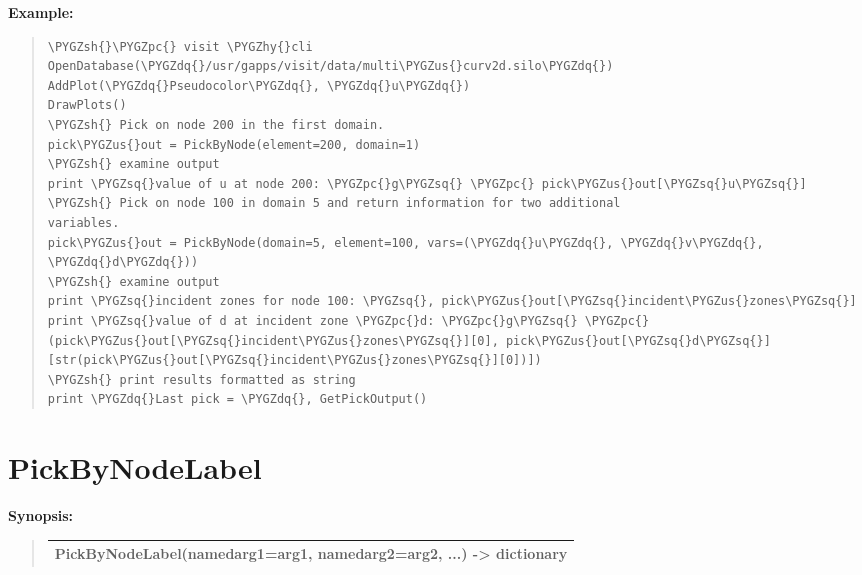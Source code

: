 \documentclass[letterpaper,10pt,english]{sphinxmanual}
\def\PYGZus{\char`\_}
\def\PYGZsh{\char`\#}
\def\PYGZpc{\char`\%}
\def\PYGZhy{\char`\-}
\def\PYGZsq{\char`\'}
\def\PYGZdq{\char`\"}
\renewcommand\PYGZsq{\textquotesingle}
\begin{document}
\begin{DUlineblock}{0em}
\item[] \textbf{Example:}
\item[] 
\end{DUlineblock}
\begin{quote}

\begin{Verbatim}[commandchars=\\\{\}]
\PYGZsh{}\PYGZpc{} visit \PYGZhy{}cli
OpenDatabase(\PYGZdq{}/usr/gapps/visit/data/multi\PYGZus{}curv2d.silo\PYGZdq{})
AddPlot(\PYGZdq{}Pseudocolor\PYGZdq{}, \PYGZdq{}u\PYGZdq{})
DrawPlots()
\PYGZsh{} Pick on node 200 in the first domain.
pick\PYGZus{}out = PickByNode(element=200, domain=1)
\PYGZsh{} examine output
print \PYGZsq{}value of u at node 200: \PYGZpc{}g\PYGZsq{} \PYGZpc{} pick\PYGZus{}out[\PYGZsq{}u\PYGZsq{}]
\PYGZsh{} Pick on node 100 in domain 5 and return information for two additional
variables.
pick\PYGZus{}out = PickByNode(domain=5, element=100, vars=(\PYGZdq{}u\PYGZdq{}, \PYGZdq{}v\PYGZdq{}, \PYGZdq{}d\PYGZdq{}))
\PYGZsh{} examine output
print \PYGZsq{}incident zones for node 100: \PYGZsq{}, pick\PYGZus{}out[\PYGZsq{}incident\PYGZus{}zones\PYGZsq{}]
print \PYGZsq{}value of d at incident zone \PYGZpc{}d: \PYGZpc{}g\PYGZsq{} \PYGZpc{} (pick\PYGZus{}out[\PYGZsq{}incident\PYGZus{}zones\PYGZsq{}][0], pick\PYGZus{}out[\PYGZsq{}d\PYGZsq{}][str(pick\PYGZus{}out[\PYGZsq{}incident\PYGZus{}zones\PYGZsq{}][0])])
\PYGZsh{} print results formatted as string
print \PYGZdq{}Last pick = \PYGZdq{}, GetPickOutput()
\end{Verbatim}
\end{quote}


\section{PickByNodeLabel}
\label{functions:pickbynodelabel}
\begin{DUlineblock}{0em}
\item[] \textbf{Synopsis:}
\end{DUlineblock}
\begin{quote}

\begin{tabulary}{\linewidth}{|L|}
\hline

PickByNodeLabel(namedarg1=arg1, namedarg2=arg2, ...) -\textgreater{} dictionary
\\
\hline\end{tabulary}

\end{quote}
\end{document}
